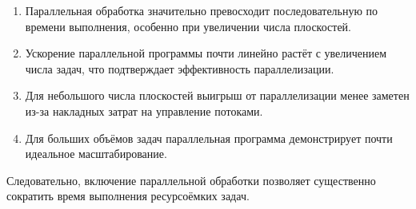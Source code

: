 \begin{enumerate}
\item Параллельная обработка значительно превосходит последовательную по времени выполнения, особенно при увеличении числа плоскостей.

\item Ускорение параллельной программы почти линейно растёт с увеличением числа задач, что подтверждает эффективность параллелизации.

\item Для небольшого числа плоскостей выигрыш от параллелизации менее заметен из-за накладных затрат на управление потоками.

\item Для больших объёмов задач параллельная программа демонстрирует почти идеальное масштабирование.
\end{enumerate}

Следовательно, включение параллельной обработки позволяет существенно сократить время выполнения ресурсоёмких задач.

\newpage